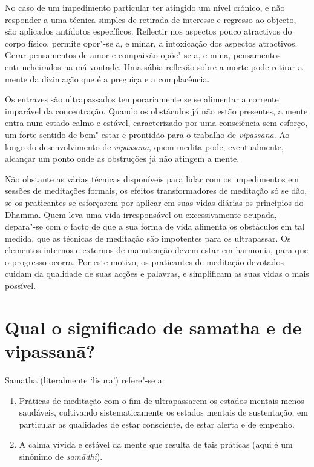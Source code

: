 No caso de um impedimento particular ter atingido um nível crónico, e
não responder a uma técnica simples de retirada de interesse e regresso
ao objecto, são aplicados antídotos específicos. Reflectir nos aspectos
pouco atractivos do corpo físico, permite opor"-se a, e minar, a
intoxicação dos aspectos atractivos. Gerar pensamentos de amor e
compaixão opõe"-se a, e mina, pensamentos entrincheirados na má vontade.
Uma sábia reflexão sobre a morte pode retirar a mente da dizimação que é
a preguiça e a complacência.

Os entraves são ultrapassados temporariamente se se alimentar a corrente
imparável da concentração. Quando os obstáculos já não estão presentes,
a mente entra num estado calmo e estável, caracterizado por uma
consciência sem esforço, um forte sentido de bem"-estar e prontidão para
o trabalho de \emph{vipassanā}. Ao longo do desenvolvimento de
\emph{vipassanā}, quem medita pode, eventualmente, alcançar um ponto
onde as obstruções já não atingem a mente.

Não obstante as várias técnicas disponíveis para lidar com os
impedimentos em sessões de meditações formais, os efeitos
transformadores de meditação só se dão, se os praticantes se esforçarem
por aplicar em suas vidas diárias os princípios do Dhamma. Quem leva uma
vida irresponsável ou excessivamente ocupada, depara"-se com o facto de
que a sua forma de vida alimenta os obstáculos em tal medida, que as
técnicas de meditação são impotentes para os ultrapassar. Os elementos
internos e externos de manutenção devem estar em harmonia, para que o
progresso ocorra. Por este motivo, os praticantes de meditação devotados
cuidam da qualidade de suas acções e palavras, e simplificam as suas
vidas o mais possível.

\section{Qual o significado de samatha e de vipassanā?}

Samatha (literalmente `lisura') refere"-se a:

\begin{enumerate}
\item
  Práticas de meditação com o fim de ultrapassarem os estados mentais
  menos saudáveis, cultivando sistematicamente os estados mentais de
  sustentação, em particular as qualidades de estar consciente, de estar
  alerta e de empenho.
\item
  A calma vívida e estável da mente que resulta de tais práticas (aqui é
  um sinónimo de \emph{samādhi}).
\end{enumerate}

